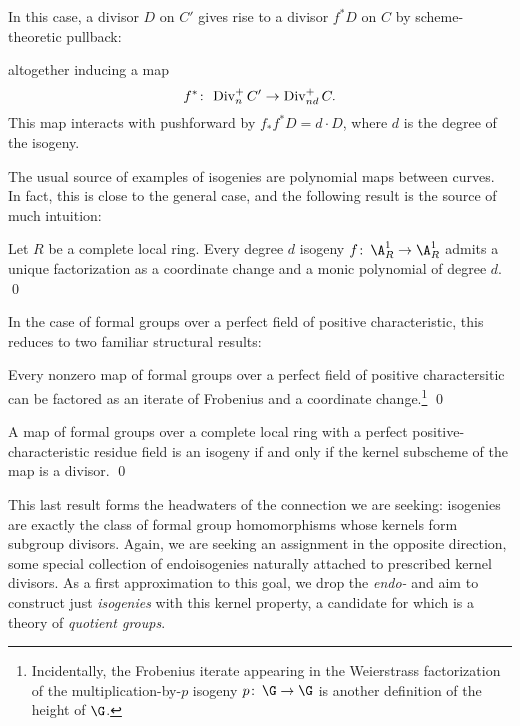 \begin{remark}
In this case, a divisor \(D\) on \(C'\) gives rise to a divisor \(f^* D\) on \(C\) by scheme-theoretic pullback:
\begin{center}
\end{center}
altogether inducing a map \[f^*\colon\thinspace \operatorname{Div}_n^+ C' \to \operatorname{Div}_{nd}^+ C.\]  This map interacts with pushforward by \(f_* f^* D = d \cdot D\), where \(d\) is the degree of the isogeny.
\end{remark}

The usual source of examples of isogenies are polynomial maps between curves.  In fact, this is close to the general case, and the following result is the source of much intuition:
\begin{lemma}
Let \(R\) be a complete local ring.  Every degree \(d\) isogeny \(f\co \A^1_R \to \A^1_R\) admits a unique factorization as a coordinate change and a monic polynomial of degree \(d\). \qed
\end{lemma}

\noindent In the case of formal groups over a perfect field of positive characteristic, this reduces to two familiar structural results:

\begin{corollary}
Every nonzero map of formal groups over a perfect field of positive charactersitic can be factored as an iterate of Frobenius and a coordinate change.\footnote{Incidentally, the Frobenius iterate appearing in the Weierstrass factorization of the multiplication-by-\(p\) isogeny \(p\co \G \to \G\) is another definition of the height of \(\G\).} \qed
\end{corollary}

\begin{corollary}
A map of formal groups over a complete local ring with a perfect positive-characteristic residue field is an isogeny if and only if the kernel subscheme of the map is a divisor. \qed
\end{corollary}

This last result forms the headwaters of the connection we are seeking: isogenies are exactly the class of formal group homomorphisms whose kernels form subgroup divisors.  Again, we are seeking an assignment in the opposite direction, some special collection of endoisogenies naturally attached to prescribed kernel divisors.  As a first approximation to this goal, we drop the \emph{endo-} and aim to construct just \emph{isogenies} with this kernel property, a candidate for which is a theory of \textit{quotient groups}.

